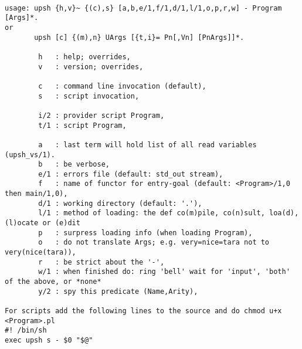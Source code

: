 \begin{verbatim}

usage: upsh {h,v}~ {(c),s} [a,b,e/1,f/1,d/1,l/1,o,p,r,w] - Program [Args]*.
or
       upsh [c] {(m),n} UArgs [{t,i}= Pn[,Vn] [PnArgs]]*.

        h   : help; overrides,
        v   : version; overrides,

        c   : command line invocation (default),
        s   : script invocation,

        i/2 : provider script Program,
        t/1 : script Program,

        a   : last term will hold list of all read variables (upsh_vs/1).
        b   : be verbose,
        e/1 : errors file (default: std_out stream),
        f   : name of functor for entry-goal (default: <Program>/1,0 then main/1,0),
        d/1 : working directory (default: '.'),
        l/1 : method of loading: the def co(m)pile, co(n)sult, loa(d), (l)ocate or (e)dit
        p   : surpress loading info (when loading Program),
        o   : do not translate Args; e.g. very=nice=tara not to very(nice(tara)),
        r   : be strict about the '-',
        w/1 : when finished do: ring 'bell' wait for 'input', 'both' of the above, or *none*
        y/2 : spy this predicate (Name,Arity),

For scripts add the following lines to the source and do chmod u+x <Program>.pl
#! /bin/sh
exec upsh s - $0 "$@"

\end{verbatim}
